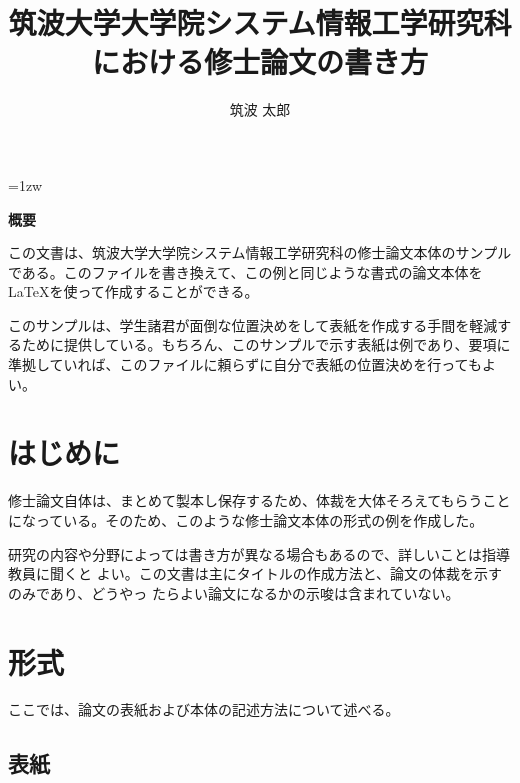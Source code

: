 \documentclass[a4paper,11pt]{jreport}
\title{筑波大学大学院システム情報工学研究科\\における修士論文の書き方}
\author{筑波 太郎}
\begin{document}
\maketitle
\thispagestyle{empty}
\newpage

\thispagestyle{empty}
\vspace*{20pt plus 1fil}
\parindent=1zw
\noindent
\begin{center}
{\bf 概要}
\vspace{5mm}
\end{center}
この文書は、筑波大学大学院システム情報工学研究科の修士論文本体のサンプル
である。このファイルを書き換えて、この例と同じような書式の論文本体を
\LaTeX を使って作成することができる。

このサンプルは、学生諸君が面倒な位置決めをして表紙を作成する手間を軽減す
るために提供している。もちろん、このサンプルで示す表紙は例であり、要項に
準拠していれば、このファイルに頼らずに自分で表紙の位置決めを行ってもよい。

\par
\vspace{0pt plus 1fil}
\newpage

\tableofcontents
\listoffigures

\pagebreak \setcounter{page}{1}


\chapter{はじめに}

修士論文自体は、まとめて製本し保存するため、体裁を大体そろえてもらうこと
になっている。そのため、このような修士論文本体の形式の例を作成した。

研究の内容や分野によっては書き方が異なる場合もあるので、詳しいことは指導教員に聞くと
よい。この文書は主にタイトルの作成方法と、論文の体裁を示すのみであり、どうやっ
たらよい論文になるかの示唆は含まれていない。

\chapter{形式}

ここでは、論文の表紙および本体の記述方法について述べる。

\section{表紙}
\end{document}
